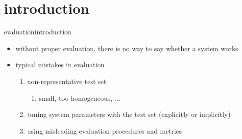     \section[intro]{introduction}
        \begin{frame}{evaluation}{introduction}
           \begin{itemize}
                \item   without proper evaluation, there is no way to say whether a system works
                \bigskip
                \item   typical mistakes in evaluation
                \begin{enumerate}
                    \item   non-representative test set
                        \begin{enumerate}
                            \item	small, too homogeneous, ...
                        \end{enumerate}
                    \item   tuning system parameters with the test set (explicitly or implicitly)
                    \item   using misleading evaluation procedures and metrics
                \end{enumerate}
            \end{itemize}
        \end{frame}
